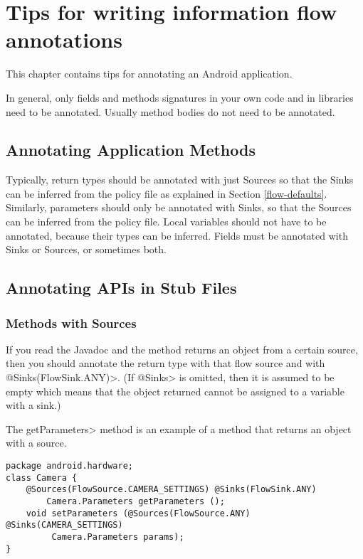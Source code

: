 \htmlhr
\chapter{Tips for writing information flow annotations\label{app-annotation}}

This chapter contains tips for annotating an Android application.

In general, only fields and methods signatures in your own code and in
libraries need to be annotated. Usually method bodies do not need to be
annotated.


\section{Annotating Application Methods\label{sec:annomethods}}

Typically, return types should be annotated with just Sources so that the Sinks can be
 inferred from the policy file as explained in Section \ref{flow-defaults}. Similarly, parameters should
  only be annotated with Sinks, so that the Sources can be inferred from  the policy file.
    Local variables should not have to be annotated, because their types can be inferred. Fields 
    must be annotated with  Sinks or Sources, or sometimes both. 

\section{Annotating APIs in Stub Files\label{sec:annoAPI}}

\subsection{Methods with Sources}
If you read the Javadoc and the method returns an object from a certain source, then you should annotate
the return type with that flow source and with \<@Sinks(FlowSink.ANY)>.  (If \<@Sinks> is omitted, then it is assumed to be empty
 which means that the object returned cannot be assigned to a variable with a sink.)

The \<getParameters> method is an example of a method that returns an object with a source.
\begin{Verbatim}
package android.hardware;
class Camera {
    @Sources(FlowSource.CAMERA_SETTINGS) @Sinks(FlowSink.ANY)
        Camera.Parameters getParameters ();
    void setParameters (@Sources(FlowSource.ANY) @Sinks(CAMERA_SETTINGS) 
         Camera.Parameters params);
}
\end{Verbatim}



